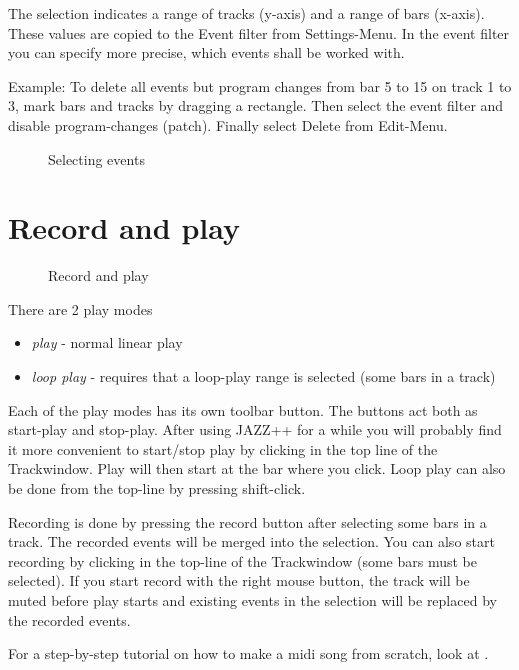 \documentclass[letterpaper]{report}
\begin{document}
The selection indicates a range of tracks (y-axis) and a range of bars (x-axis).
These values are copied to the Event filter from Settings-Menu. In the event filter
you can specify more precise, which events shall be worked with.

Example: To delete all events but program changes from bar 5 to 15 on track 1 to 3,
mark bars and tracks by dragging a rectangle. Then select the event filter and
disable program-changes (patch). Finally select Delete from Edit-Menu.

\begin{figure}%
%
%
\caption{Selecting events}%
\end{figure}

\section{Record and play}\label{recplay}

\begin{figure}%
%
%
\caption{Record and play}%
\end{figure}

There are 2 play modes
\begin{itemize}
\item {\em play} - normal linear play
\item {\em loop play} - requires that a loop-play range is selected (some bars in a track)
\end{itemize}

Each of the play modes has its own toolbar button. The buttons act both
as start-play and stop-play. After using JAZZ++ for a while you will
probably find it more convenient to start/stop play by clicking in the
top line of the Trackwindow. Play will then start at the bar where you click.
Loop play can also be done from the top-line by pressing shift-click.

Recording is done by pressing the record button after selecting
some bars in a track. The recorded events will be merged into the selection.
You can also start recording by clicking in the top-line of the Trackwindow
(some bars must be selected). If you start record with the right mouse button,
the track will be muted before play starts and existing events in the
selection will be replaced by the recorded events.

For a step-by-step tutorial on how to make a midi song from scratch, look at
.
\end{document}
